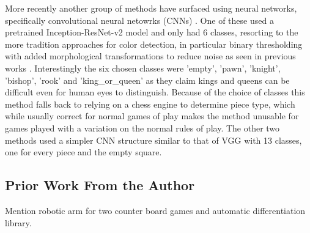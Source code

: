 More recently another group of methods have surfaced using neural networks, specifically convolutional neural netowrks (CNNs) \cite{}.
One of these used a pretrained Inception-ResNet-v2 model \cite{} and only had 6 classes, resorting to the more tradition approaches for color detection,
in particular binary thresholding with added morphological transformations to reduce noise as seen in previous works \cite{}.  
Interestingly the six chosen classes were 'empty', 'pawn', 'knight', 'bishop', 'rook' and 'king\_or\_queen' as they claim kings and queens can be 
difficult even for human eyes to distinguish.  Because of the choice of classes this method falls back to relying on a chess engine to determine piece type,
which while usually correct for normal games of play makes the method unusable for games played with a variation on the normal rules of play.
The other two methods used a simpler CNN structure similar to that of VGG \cite{} with 13 classes, one for every piece and the empty square.


\subsection{Prior Work From the Author}
Mention robotic arm for two counter board games and automatic differentiation library.
